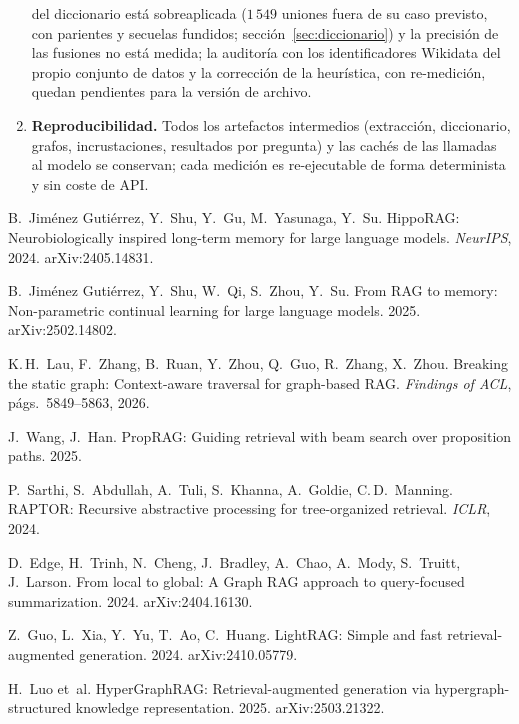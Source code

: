 \documentclass[11pt,a4paper]{article}
\begin{document}
\begin{enumerate}[leftmargin=1.6em, itemsep=2pt]
  del diccionario está sobreaplicada ($1\,549$ uniones fuera de su caso
  previsto, con parientes y secuelas fundidos; sección~\ref{sec:diccionario})
  y la precisión de las fusiones no está medida; la auditoría con los
  identificadores Wikidata del propio conjunto de datos y la corrección de la
  heurística, con re-medición, quedan pendientes para la versión de archivo.
\item \textbf{Reproducibilidad.} Todos los artefactos intermedios
  (extracción, diccionario, grafos, incrustaciones, resultados por
  pregunta) y las cachés de las llamadas al modelo se conservan; cada
  medición es re-ejecutable de forma determinista y sin coste de API.
\end{enumerate}

\begin{thebibliography}{99}\small

 B.~Jiménez Gutiérrez, Y.~Shu, Y.~Gu, M.~Yasunaga,
Y.~Su. HippoRAG: Neurobiologically inspired long-term memory for large
language models. \emph{NeurIPS}, 2024. arXiv:2405.14831.

 B.~Jiménez Gutiérrez, Y.~Shu, W.~Qi, S.~Zhou, Y.~Su.
From RAG to memory: Non-parametric continual learning for large language
models. 2025. arXiv:2502.14802.

 K.\,H.~Lau, F.~Zhang, B.~Ruan, Y.~Zhou, Q.~Guo,
R.~Zhang, X.~Zhou. Breaking the static graph: Context-aware traversal for
graph-based RAG. \emph{Findings of ACL}, págs.~5849--5863, 2026.

 J.~Wang, J.~Han. PropRAG: Guiding retrieval with beam
search over proposition paths. 2025.

 P.~Sarthi, S.~Abdullah, A.~Tuli, S.~Khanna, A.~Goldie,
C.\,D.~Manning. RAPTOR: Recursive abstractive processing for
tree-organized retrieval. \emph{ICLR}, 2024.

 D.~Edge, H.~Trinh, N.~Cheng, J.~Bradley, A.~Chao,
A.~Mody, S.~Truitt, J.~Larson. From local to global: A Graph RAG approach
to query-focused summarization. 2024. arXiv:2404.16130.

 Z.~Guo, L.~Xia, Y.~Yu, T.~Ao, C.~Huang. LightRAG:
Simple and fast retrieval-augmented generation. 2024. arXiv:2410.05779.

 H.~Luo et~al. HyperGraphRAG: Retrieval-augmented
generation via hypergraph-structured knowledge representation. 2025.
arXiv:2503.21322.


\end{thebibliography}
\end{document}
